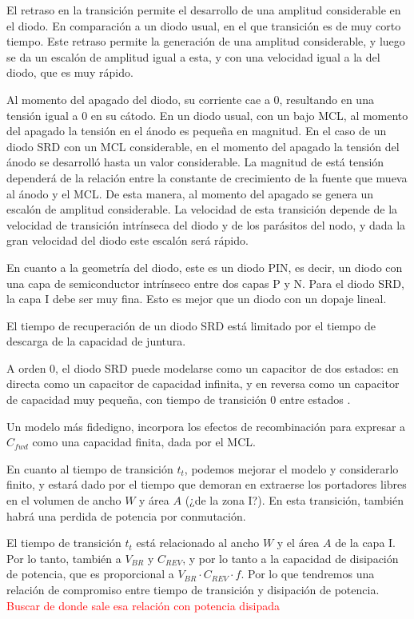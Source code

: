 El retraso en la transición permite el desarrollo de una amplitud considerable
en el diodo. En comparación a un diodo usual, en el que transición es de muy
corto tiempo. Este retraso permite la generación de una amplitud considerable, y
luego se da un escalón de amplitud igual a esta, y con una velocidad igual a la
del diodo, que es muy rápido.

Al momento del apagado del diodo, su corriente cae a 0, resultando en una
tensión igual a 0 en su cátodo. En un diodo usual, con un bajo MCL, al momento
del apagado la tensión en el ánodo es pequeña en magnitud. En el caso de un
diodo SRD con un MCL considerable, en el momento del apagado la tensión del
ánodo se desarrolló hasta un valor considerable. La magnitud de está tensión
dependerá de la relación entre la constante de crecimiento de la fuente que
mueva al ánodo y el MCL. De esta manera, al momento del apagado se genera un
escalón de amplitud considerable. La velocidad de esta transición depende de la
velocidad de transición intrínseca del diodo y de los parásitos del nodo, y dada
la gran velocidad del diodo este escalón será rápido.

En cuanto a la geometría del diodo, este es un diodo PIN, es decir, un diodo con
una capa de semiconductor intrínseco entre dos capas P y N. Para el diodo SRD,
la capa I debe ser muy fina. Esto es mejor que un diodo con un dopaje lineal.

El tiempo de recuperación de un diodo SRD está limitado por el tiempo de
descarga de la capacidad de juntura.

A orden 0, el diodo SRD puede modelarse como un capacitor de dos estados: en
directa como un capacitor de capacidad infinita, y en reversa como un capacitor
de capacidad muy pequeña, con tiempo de transición 0 entre estados
\cite{moll1969}.

Un modelo más fidedigno, incorpora los efectos de recombinación para expresar a
$C_{fwd}$ como una capacidad finita, dada por el MCL.

En cuanto al tiempo de transición $t_t$, podemos mejorar el modelo y
considerarlo finito, y estará dado por el tiempo que demoran en extraerse los
portadores libres en el volumen de ancho $W$ y área $A$ (¿de la zona I?). En
esta transición, también habrá una perdida de potencia por conmutación.

El tiempo de transición $t_t$ está relacionado al ancho $W$ y el área $A$ de la
capa I. Por lo tanto, también a $V_{BR}$ y $C_{REV}$, y por lo tanto a la
capacidad de disipación de potencia, que es proporcional a $V_{BR} \cdot C_{REV}
\cdot f$. Por lo que tendremos una relación de compromiso entre tiempo de
transición y disipación de potencia. \textcolor{red}{Buscar de donde sale esa
relación con potencia disipada}

